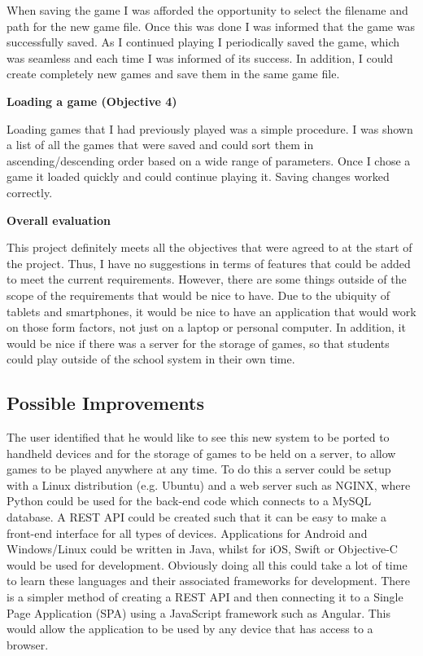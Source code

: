 When saving the game I was afforded the opportunity to select the filename and path for the new game file. Once this was done I was informed that the game was successfully saved. As I continued playing I periodically saved the game, which was seamless and each time I was informed of its success. In addition, I could create completely new games and save them in the same game file.

\textbf{Loading a game (Objective 4)}

Loading games that I had previously played was a simple procedure. I was shown a list of all the games that were saved and could sort them in ascending/descending order based on a wide range of parameters. Once I chose a game it loaded quickly and could continue playing it. Saving changes worked correctly.

\textbf{Overall evaluation}

This project definitely meets all the objectives that were agreed to at the start of the project. Thus, I have no suggestions in terms of features that could be added to meet the current requirements. However, there are some things outside of the scope of the requirements that would be nice to have. Due to the ubiquity of tablets and smartphones, it would be nice to have an application that would work on those form factors, not just on a laptop or personal computer. In addition, it would be nice if there was a server for the storage of games, so that students could play outside of the school system in their own time.
\subsection{Possible Improvements}
The user identified that he would like to see this new system to be ported to handheld devices and for the storage of games to be held on a server, to allow games to be played anywhere at any time. To do this a server could be setup with a Linux distribution (e.g. Ubuntu) and a web server such as NGINX, where Python could be used for the back-end code which connects to a MySQL database. A REST API could be created such that it can be easy to make a front-end interface for all types of devices. Applications for Android and Windows/Linux could be written in Java, whilst for iOS, Swift or Objective-C would be used for development. Obviously doing all this could take a lot of time to learn these languages and their associated frameworks for development. There is a simpler method of creating a REST API and then connecting it to a Single Page Application (SPA) using a JavaScript framework such as Angular. This would allow the application to be used by any device that has access to a browser.

